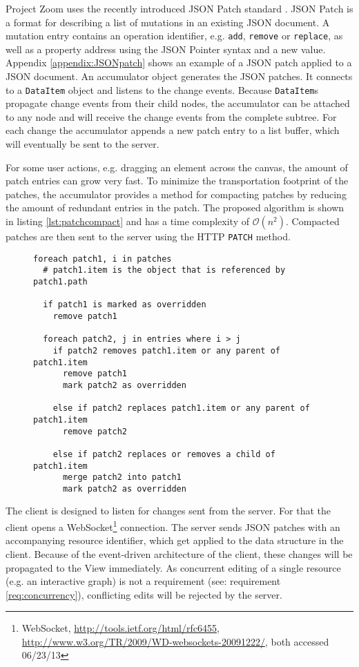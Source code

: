 Project Zoom uses the recently introduced JSON Patch standard \cite{RFC6902}. JSON Patch is a format for describing a list of mutations in an existing JSON document. A mutation entry contains an operation identifier, e.g. \texttt{add}, \texttt{remove} or \texttt{replace}, as well as a property address using the JSON Pointer syntax and a new value. Appendix \ref{appendix:JSONpatch} shows an example of a JSON patch applied to a JSON document. 
An accumulator object generates the JSON patches. It connects to a \texttt{DataItem} object and listens to the change events. Because \texttt{DataItem}s propagate change events from their child nodes, the accumulator can be attached to any node and will receive the change events from the complete subtree. For each change the accumulator appends a new patch entry to a list buffer, which will eventually be sent to the server.

For some user actions, e.g. dragging an element across the canvas, the amount of patch entries can grow very fast. To minimize the transportation footprint of the patches, the accumulator provides a method for compacting patches by reducing the amount of redundant entries in the patch. The proposed algorithm is shown in listing \ref{lst:patchcompact} and has a time complexity of $\mathcal O(n^2)$. Compacted patches are then sent to the server using the HTTP \texttt{PATCH} method.

\begin{figure}
\begin{lstlisting}[language=pseudo,caption={Pseudo code for compacting a chronologically ordered list of JSON patches},label={lst:patchcompact}]
foreach patch1, i in patches
  # patch1.item is the object that is referenced by patch1.path
  
  if patch1 is marked as overridden
    remove patch1
  
  foreach patch2, j in entries where i > j
    if patch2 removes patch1.item or any parent of patch1.item
      remove patch1
      mark patch2 as overridden
      
    else if patch2 replaces patch1.item or any parent of patch1.item
      remove patch2
     
    else if patch2 replaces or removes a child of patch1.item
      merge patch2 into patch1
      mark patch2 as overridden
\end{lstlisting}
\end{figure}

The client is designed to listen for changes sent from the server. For that the client opens a WebSocket\footnote{WebSocket, \url{http://tools.ietf.org/html/rfc6455}, \url{http://www.w3.org/TR/2009/WD-websockets-20091222/}, both accessed 06/23/13} connection. The server sends JSON patches with an accompanying resource identifier, which get applied to the data structure in the client. Because of the event-driven architecture of the client, these changes will be propagated to the View immediately. As concurrent editing of a single resource (e.g. an interactive graph) is not a requirement (see: requirement \ref{req:concurrency}), conflicting edits will be rejected by the server.

